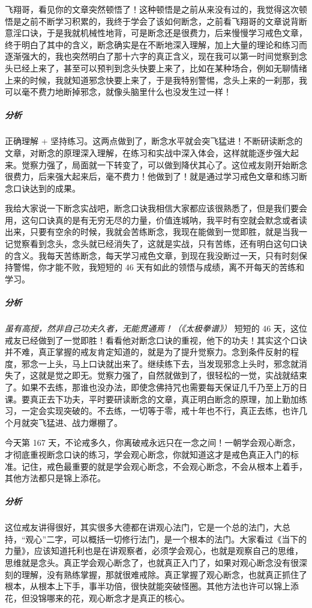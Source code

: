 \begin{case}
    飞翔哥，看见你的文章突然顿悟了！这种顿悟是之前从来没有过的，我觉得这次顿悟是之前不断学习积累的，我终于学会了该如何断念，之前看飞翔哥的文章说背断意淫口诀，于是我就机械性地背，可是断念还是很费力，后来慢慢学习戒色文章，终于明白了其中的含义，断念确实是在不断地深入理解，加上大量的理论和练习而逐渐强大的，我也突然明白了那十六字的真正含义，现在我可以第一时间觉察到念头已经上来了，甚至可以预判到念头快要上来了，比如在某种场合，例如无聊情绪上来的时候，我就知道邪念快要上来了，于是我特别警惕，念头上来的一刹那，我可以毫不费力地断掉邪念，就像头脑里什么也没发生过一样！
    \subparagraph{分析} 正确理解 + 坚持练习。这两点做到了，断念水平就会突飞猛进！不断研读断念的文章，对断念的原理深入理解，在练习和实战中深入体会，这样就能逐步强大起来。觉察力强了，局面就一下转变了，可以做到降伏其心了。这位戒友刚开始断念很费力，后来强大起来后，毫不费力！他做到了！就是通过学习戒色文章和练习断念口诀达到的成果。
\end{case}

\begin{case}
    我给大家说一下断念实战吧，断念口诀我相信大家都应该很熟悉了，但是我们要会用，这句口诀真的是有无穷无尽的力量，价值连城呐，我平时有空就会默念或者读出来，只要有空余的时候，我就会苦练断念，我现在能做到一觉即胜，就是当我一记觉察看到念头，念头就已经消失了，这就是实战，只有苦练，还有明白这句口诀的含义。我每天苦练断念，每天学习戒色文章，到现在我没断过一天，只有时刻保持警惕，你才能不败，我短短的 46 天有如此的领悟与成绩，离不开每天的苦练和学习。
    \subparagraph{分析} \textit{虽有高授，然非自己功夫久者，无能贯通焉！（《太极拳谱》）} 短短的 46 天，这位戒友已经做到了一觉即胜！看看他对断念口诀的重视，他下的功夫！其实这个口诀并不难，真正掌握的戒友肯定知道的，就是为了提升觉察力。念到条件反射的程度，邪念一上头，马上口诀就出来了。继续练下去，当发现邪念上头时，邪念就消失了，这就是觉之即无。觉察力强了，自然就做到了，很轻松的一觉，实战就结束了。如果不去练，那谁也没办法，即使念佛持咒也需要每天保证几千乃至上万的日课。要真正去下功夫，平时要研读断念的文章，真正明白断念的原理，加上勤加练习，一定会实现突破的。不去练，一切等于零，戒十年也不行，真正去练，也许几个月就突飞猛进、战力爆棚了。
\end{case}

\begin{case}
    今天第 167 天，不论戒多久，你离破戒永远只在一念之间！一朝学会观心断念，才彻底重视断念口诀的练习，学会观心断念，你就知道这才是戒色真正入门的标准。记住，戒色最重要的就是学会观心断念，不会观心断念，不会从根本上着手，其他方法都只是锦上添花。
    \subparagraph{分析} 这位戒友讲得很好，其实很多大德都在讲观心法门，它是一个总的法门，大总持，“观心”二字，可以概括一切修行法门，是一个根本的法门。大家看过《当下的力量》，应该知道托利也是在讲观察者，必须学会观心，也就是观察自己的思维，思维就是念头。真正学会观心断念了，也就真正入门了，如果对观心断念没有很深刻的理解，没有熟练掌握，那就很难戒除。真正掌握了观心断念，也就真正抓住了根本，从根本上下手，事半功倍，很快就能突破怪圈。其他方法也许可以锦上添花，但没锦哪来的花，观心断念才是真正的核心。
\end{case}


